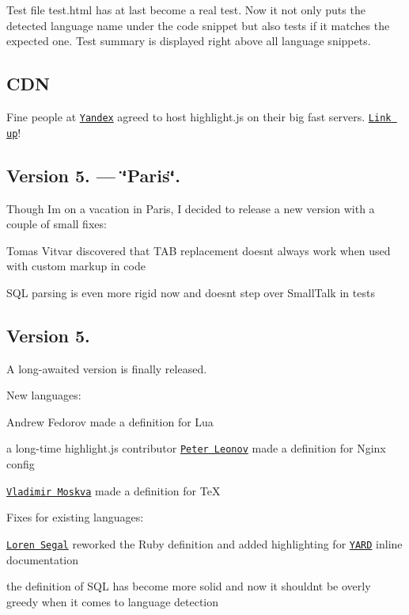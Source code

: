 Test file test.\+html has at last become a real test. Now it not only puts the detected language name under the code snippet but also tests if it matches the expected one. Test summary is displayed right above all language snippets.

\subsection*{C\+DN}

Fine people at \href{http://yandex.com/}{\tt Yandex} agreed to host highlight.\+js on their big fast servers. \href{http://softwaremaniacs.org/soft/highlight/en/download/}{\tt Link up}!

\subsection*{Version 5. — \char`\"{}\+Paris\char`\"{}.}

Though I\textquotesingle{}m on a vacation in Paris, I decided to release a new version with a couple of small fixes\+:


\begin{DoxyItemize}
\item Tomas Vitvar discovered that T\+AB replacement doesn\textquotesingle{}t always work when used with custom markup in code
\item S\+QL parsing is even more rigid now and doesn\textquotesingle{}t step over Small\+Talk in tests
\end{DoxyItemize}

\subsection*{Version 5.}

A long-\/awaited version is finally released.

New languages\+:


\begin{DoxyItemize}
\item Andrew Fedorov made a definition for Lua
\item a long-\/time highlight.\+js contributor \href{http://kung-fu-tzu.ru/}{\tt Peter Leonov} made a definition for Nginx config
\item \href{http://fulc.ru/}{\tt Vladimir Moskva} made a definition for TeX
\end{DoxyItemize}

Fixes for existing languages\+:


\begin{DoxyItemize}
\item \href{http://gnuu.org/}{\tt Loren Segal} reworked the Ruby definition and added highlighting for \href{http://yardoc.org/}{\tt Y\+A\+RD} inline documentation
\item the definition of S\+QL has become more solid and now it shouldn\textquotesingle{}t be overly greedy when it comes to language detection
\end{DoxyItemize}

